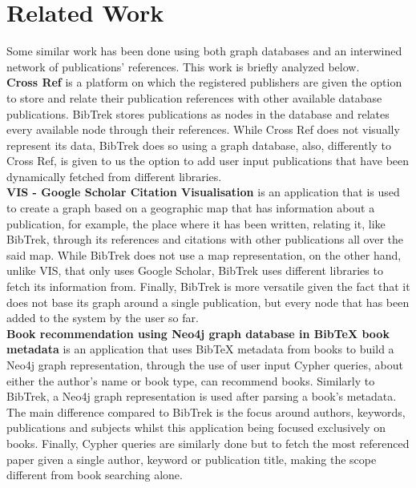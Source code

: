 \documentclass[twocolumn]{article}
\begin{document}
\section{Related Work}
Some similar work has been done using both graph databases and an interwined network of publications' references. This work is briefly analyzed below.\\[1\baselineskip]
\textbf{Cross Ref} \cite{crossref} is a platform on which the registered publishers are given the option to store and relate their publication references with other available database publications. BibTrek stores publications as nodes in the database and relates every available node through their references. While Cross Ref does not visually represent its data, BibTrek does so using a graph database, also, differently to Cross Ref, is given to us the option to add user input publications that have been dynamically fetched from different libraries.\\[1\baselineskip]
\textbf{VIS - Google Scholar Citation Visualisation} \cite{vis} is an application that is used to create a graph based on a geographic map that has information about a publication, for example, the place where it has been written, relating it, like BibTrek, through its references and citations with other publications all over the said map. While BibTrek does not use a map representation, on the other hand, unlike VIS, that only uses Google Scholar, BibTrek uses different libraries to fetch its information from. Finally, BibTrek is more versatile given the fact that it does not base its graph around a single publication, but every node that has been added to the system by the user so far. \\[1\baselineskip]
\textbf{Book recommendation using Neo4j graph database in BibTeX book metadata} \cite{bookrecusingneo4j} is an application that uses BibTeX metadata from books to build a Neo4j graph representation, through the use of user input Cypher queries, about either the author's name or book type, can recommend books. Similarly to BibTrek, a Neo4j graph representation is used after parsing a book's metadata. The main difference compared to BibTrek is the focus around authors, keywords, publications and subjects whilst this application being focused exclusively on books. Finally, Cypher queries are similarly done but to fetch the most referenced paper given a single author, keyword or publication title, making the scope different from book searching alone.
\end{document}
